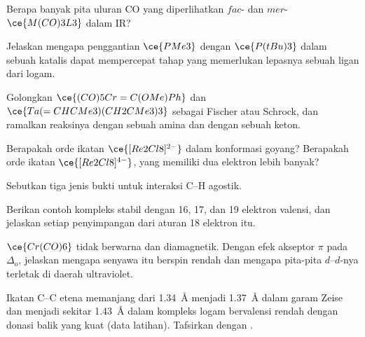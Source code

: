\begin{exercise}[$\star\star$]\label{exo:b3:organometallic-bonding:5}
Berapa banyak pita uluran CO yang diperlihatkan $fac$- dan $mer$-$\ce{M(CO)3L3}$ dalam IR?
\end{exercise}

\begin{exercise}[$\star\star$]\label{exo:b3:organometallic-bonding:6}
Jelaskan mengapa penggantian $\ce{PMe3}$ dengan $\ce{P(tBu)3}$ dalam sebuah katalis dapat mempercepat tahap yang memerlukan
lepasnya sebuah ligan dari logam.
\end{exercise}

\begin{exercise}[$\star\star$]\label{exo:b3:organometallic-bonding:7}
Golongkan $\ce{(CO)5Cr=C(OMe)Ph}$ dan $\ce{Ta(=CHCMe3)(CH2CMe3)3}$ sebagai  Fischer atau
Schrock, dan ramalkan reaksinya dengan sebuah amina dan dengan sebuah keton.
\end{exercise}

\begin{exercise}[$\star\star$]\label{exo:b3:organometallic-bonding:8}
Berapakah orde ikatan $\ce{[Re2Cl8]^{2-}}$ dalam konformasi goyang? Berapakah orde ikatan
$\ce{[Re2Cl8]^{4-}}$, yang memiliki dua elektron lebih banyak?
\end{exercise}

\begin{exercise}[$\star\star$]\label{exo:b3:organometallic-bonding:9}
Sebutkan tiga jenis bukti untuk interaksi C--H agostik.
\end{exercise}

\begin{exercise}[$\star\star\star$]\label{exo:b3:organometallic-bonding:10}
Berikan contoh kompleks stabil dengan 16, 17, dan 19 elektron valensi, dan jelaskan
setiap penyimpangan dari aturan 18 elektron itu.
\end{exercise}

\begin{exercise}[$\star\star\star$]\label{exo:b3:organometallic-bonding:11}
$\ce{Cr(CO)6}$ tidak berwarna dan diamagnetik. Dengan efek akseptor $\pi$ pada $\Delta_{\mathrm o}$, jelaskan
mengapa senyawa itu berspin rendah dan mengapa pita-pita $d$--$d$-nya terletak di daerah ultraviolet.
\end{exercise}

\begin{exercise}[$\star\star\star$]\label{exo:b3:organometallic-bonding:12}
Ikatan C--C etena memanjang dari \qty{1.34}{\angstrom} menjadi \qty{1.37}{\angstrom} dalam garam Zeise dan menjadi
sekitar \qty{1.43}{\angstrom} dalam kompleks logam bervalensi rendah dengan donasi balik yang kuat (data
latihan). Tafsirkan dengan .
\end{exercise}

